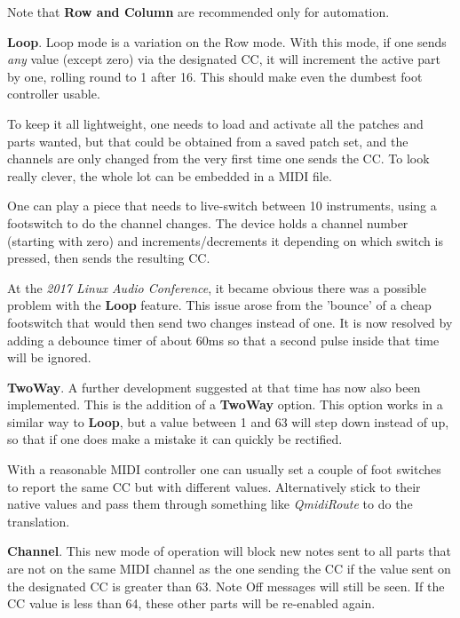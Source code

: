    Note that \textbf{Row and Column} are recommended only for automation.

   \textbf{Loop}.  Loop mode is a variation on the Row mode.
   With this mode, if one sends \textsl{any} value (except zero)
   via the designated CC,
   it will increment the active part by one, rolling round to 1 after 16.
   This should make even the dumbest foot controller usable.

   To keep it all lightweight, one needs to load and activate all the patches
   and parts wanted, but that could be obtained from a saved patch set, and the
   channels are only changed from the very first time one sends the CC.  To
   look really clever, the whole lot can be embedded in a MIDI file.

   One can play a piece that needs to live-switch between 10 instruments, using
   a footswitch to do the channel changes. The device holds a channel
   number (starting with zero) and increments/decrements it depending on which
   switch is pressed, then sends the resulting CC.

   At the \textsl{2017 Linux Audio Conference},
   it became obvious there was a possible problem with the \textbf{Loop}
   feature. This issue arose from the 'bounce' of a cheap footswitch that would
   then send two changes instead of one. It is now resolved by adding a
   debounce timer of about 60ms so that a second pulse inside that time will be
   ignored.

   \textbf{TwoWay}.
   A further development suggested at that time has now also been implemented. This
   is the addition of a \textbf{TwoWay} option.
   This option works in a similar way to \textbf{Loop}, but
   a value between 1 and 63 will step down instead of up, so that if one does make
   a mistake it can quickly be rectified.

   With a reasonable MIDI controller one can usually set a couple of foot switches
   to report the same CC but with different values. Alternatively stick to their
   native values and pass them through something like \textsl{QmidiRoute} to do the
   translation.

   \textbf{Channel}.
   This new mode of operation will block new notes sent to all parts that are not
   on the same MIDI channel as the one sending the CC if the value sent on the
   designated CC is greater than 63. Note Off messages will still be seen. If the
   CC value is less than 64, these other parts will be re-enabled again.

